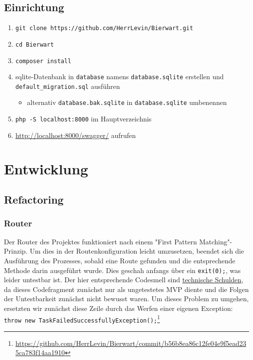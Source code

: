 \documentclass[12pt,a4paper,titlepage,ngerman,pdftex]{report}
\begin{document}
    \section{Einrichtung}\label{sec:einrichtung}

    \begin{enumerate}
        \item \texttt{git clone https://github.com/HerrLevin/Bierwart.git}
        \item \texttt{cd Bierwart}
        \item \texttt{composer install}
        \item sqlite-Datenbank in \texttt{database} namens \texttt{database.sqlite} erstellen und\\ \texttt{default\_migration.sql} ausführen
        \begin{itemize}
            \item alternativ \texttt{database.bak.sqlite} in \texttt{database.sqlite} umbenennen
        \end{itemize}
        \item \texttt{php -S localhost:8000} im Hauptverzeichnis
        \item \url{http://localhost:8000/swagger/} aufrufen
    \end{enumerate}


    \chapter{Entwicklung}\label{ch:entwicklung}


    \section{Refactoring}\label{sec:refactoring}

    \subsection{Router}\label{subsec:router}
    Der Router des Projektes funktioniert nach einem "First Pattern Matching"-Prinzip.
    Um dies in der Routenkonfiguration leicht umzusetzen, beendet sich die Ausführung des Prozesses, sobald eine Route gefunden und die entsprechende Methode darin ausgeführt wurde.
    Dies geschah anfangs über ein \verb|exit(0);|, was leider untestbar ist.
    Der hier entsprechende Codesmell sind \href{https://refactoring.guru/refactoring/technical-debt}{technische Schulden}, da dieses Codefragment zunächst nur als ungetestetes MVP diente und die Folgen der \glqq Untestbarkeit\grqq{} zunächst nicht bewusst waren.
    Um dieses Problem zu umgehen, ersetzten wir zunächst diese Zeile durch das Werfen einer eigenen Exception: \verb|throw new TaskFailedSuccessfullyException();|\footnote{\url{https://github.com/HerrLevin/Bierwart/commit/b56b8ea86c12fe04e9f5ead235ca783f14aa1910}}
\end{document}
